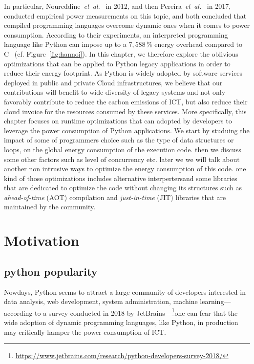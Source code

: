 In particular, Noureddine~\emph{et~al.}~\cite{noureddine_preliminary_2012} in 2012, and then Pereira~\emph{et~al.}~\cite{pereira_energy_2017} in 2017, conducted empirical power measurements on this topic, and both concluded that compiled programming languages overcome dynamic ones when it comes to power consumption.
According to their experiments, an interpreted programming language like Python can impose up to a $7,588\,\%$ energy overhead compared to C~\cite{pereira_energy_2017} (cf. Figure~\ref{fig:hannoi}).
In this chapter, we therefore explore the oblivious optimizations that can be applied to Python legacy applications in order to reduce their energy footprint.
As Python is widely adopted by software services deployed in public and private Cloud infrastructures, we believe that our contributions will benefit to wide diversity of legacy systems and not only favorably contribute to reduce the carbon emissions of ICT, but also reduce their cloud invoice for the resources consumed by these services.
More specifically, this chapter focuses on runtime optimizations that can adopted by developers to leverage the power consumption of Python applications.
We start by studuing the impact of some of programmers choice such as the type of data structures or loops, on the global energy consumption of the execution code.
then we discuss some other factors such as level of concurrency etc. later we we will talk about another non intrusive ways to optimize the energy consumption of this code. one kind of those optimizations includes alternative interpertersand some libraries that are dedicated to optimize the code without changing its structures such as \emph{ahead-of-time} (AOT) compilation and \emph{just-in-time} (JIT) libraries that are maintained by the community.



\section{Motivation}
\subsection{python popularity}

Nowdays, Python seems to attract a large community of developers interested in data analysis, web development, system administration, machine learning---according to a survey conducted in 2018 by JetBrains---\footnote{\url{https://www.jetbrains.com/research/python-developers-survey-2018/}}one can fear that the wide adoption of dynamic programming languages, like Python, in production may critically hamper the power consumption of ICT.

